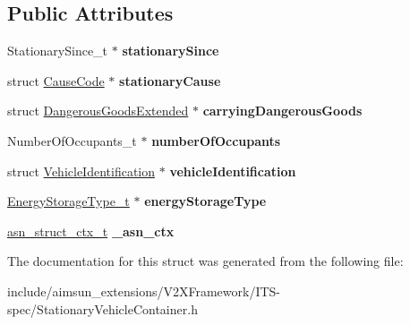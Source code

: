 \subsection*{Public Attributes}
\begin{DoxyCompactItemize}
\item 
Stationary\+Since\+\_\+t $\ast$ {\bfseries stationary\+Since}\hypertarget{structStationaryVehicleContainer_a9b3ab1c648cefc1da805ac3afe262205}{}\label{structStationaryVehicleContainer_a9b3ab1c648cefc1da805ac3afe262205}

\item 
struct \hyperlink{structCauseCode}{Cause\+Code} $\ast$ {\bfseries stationary\+Cause}\hypertarget{structStationaryVehicleContainer_a68a8e537afc4f70b2421a296b170f28f}{}\label{structStationaryVehicleContainer_a68a8e537afc4f70b2421a296b170f28f}

\item 
struct \hyperlink{structDangerousGoodsExtended}{Dangerous\+Goods\+Extended} $\ast$ {\bfseries carrying\+Dangerous\+Goods}\hypertarget{structStationaryVehicleContainer_a67c8a823f45432d4fc5ec494d61ebd60}{}\label{structStationaryVehicleContainer_a67c8a823f45432d4fc5ec494d61ebd60}

\item 
Number\+Of\+Occupants\+\_\+t $\ast$ {\bfseries number\+Of\+Occupants}\hypertarget{structStationaryVehicleContainer_af09b58ca675634cbc645ba85ae73d452}{}\label{structStationaryVehicleContainer_af09b58ca675634cbc645ba85ae73d452}

\item 
struct \hyperlink{structVehicleIdentification}{Vehicle\+Identification} $\ast$ {\bfseries vehicle\+Identification}\hypertarget{structStationaryVehicleContainer_a0462a4b68f8a54555b45653f83d93fb4}{}\label{structStationaryVehicleContainer_a0462a4b68f8a54555b45653f83d93fb4}

\item 
\hyperlink{structBIT__STRING__s}{Energy\+Storage\+Type\+\_\+t} $\ast$ {\bfseries energy\+Storage\+Type}\hypertarget{structStationaryVehicleContainer_a612a5692bf6ce1f624b31ff3f1348e30}{}\label{structStationaryVehicleContainer_a612a5692bf6ce1f624b31ff3f1348e30}

\item 
\hyperlink{structasn__struct__ctx__s}{asn\+\_\+struct\+\_\+ctx\+\_\+t} {\bfseries \+\_\+asn\+\_\+ctx}\hypertarget{structStationaryVehicleContainer_a6747273faf1784a5f88ff82108c4958c}{}\label{structStationaryVehicleContainer_a6747273faf1784a5f88ff82108c4958c}

\end{DoxyCompactItemize}


The documentation for this struct was generated from the following file\+:\begin{DoxyCompactItemize}
\item 
include/aimsun\+\_\+extensions/\+V2\+X\+Framework/\+I\+T\+S-\/spec/Stationary\+Vehicle\+Container.\+h\end{DoxyCompactItemize}
